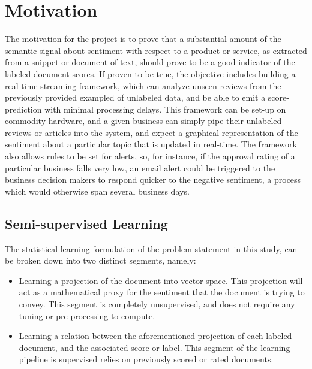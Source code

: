 \documentclass[conference]{IEEEtran}
\begin{document}
\section{Motivation}
The motivation for the project is to prove that a substantial amount of the semantic signal about sentiment with respect to a product or service, as extracted from a snippet or document of text, should prove to be a good indicator of the labeled document scores. If proven to be true, the objective includes building a real-time streaming framework, which can analyze unseen reviews from the previously provided exampled of unlabeled data, and be able to emit a score-prediction with minimal processing delays. This framework can be set-up on commodity hardware, and a given business can simply pipe their unlabeled reviews or articles into the system, and expect a graphical representation of the sentiment about a particular topic that is updated in real-time. The framework also allows rules to be set for alerts, so, for instance, if the approval rating of a particular business falls very low, an email alert could be triggered to the business decision makers to respond quicker to the negative sentiment, a process which would otherwise span several business days.

\subsection{Semi-supervised Learning}
The statistical learning formulation of the problem statement in this study, can be broken down into two distinct segments, namely:
\begin{itemize}
	\item Learning a projection of the document into vector space. This projection will act as a mathematical proxy for the sentiment that the document is trying to convey. This segment is completely unsupervised, and does not require any tuning or pre-processing to compute.
  \item Learning a relation between the aforementioned projection of each labeled document, and the associated score or label. This segment of the learning pipeline is supervised relies on previously scored or rated documents.
\end{itemize}


\end{document}
